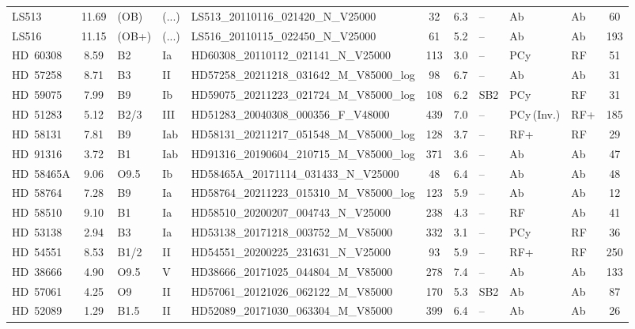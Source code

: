 {\begin{landscape}
\begin{longtable}{lclllcclllc}
\noalign{\smallskip}
LS513 & 11.69 & (OB) & (...) & LS513\_20110116\_021420\_N\_V25000 & 32 & 6.3 & -- & Ab & Ab & 60 \\
\noalign{\smallskip}
LS516 & 11.15 & (OB+) & (...) & LS516\_20110115\_022450\_N\_V25000 & 61 & 5.2 & -- & Ab & Ab & 193 \\
\noalign{\smallskip}
HD~60308 & 8.59 & B2 & Ia & HD60308\_20110112\_021141\_N\_V25000 & 113 & 3.0 & -- & PCy & RF & 51 \\
\noalign{\smallskip}
HD~57258 & 8.71 & B3 & II & HD57258\_20211218\_031642\_M\_V85000\_log & 98 & 6.7 & -- & Ab & Ab & 31 \\
\noalign{\smallskip}
HD~59075 & 7.99 & B9 & Ib & HD59075\_20211223\_021724\_M\_V85000\_log & 108 & 6.2 & SB2 & PCy & RF & 31 \\
\noalign{\smallskip}
HD~51283 & 5.12 & B2/3 & III & HD51283\_20040308\_000356\_F\_V48000 & 439 & 7.0 & -- & PCy\,(Inv.) & RF+ & 185 \\
\noalign{\smallskip}
HD~58131 & 7.81 & B9 & Iab & HD58131\_20211217\_051548\_M\_V85000\_log & 128 & 3.7 & -- & RF+ & RF & 29 \\
\noalign{\smallskip}
HD~91316 & 3.72 & B1 & Iab & HD91316\_20190604\_210715\_M\_V85000\_log & 371 & 3.6 & -- & Ab & Ab & 47 \\
\noalign{\smallskip}
HD~58465A & 9.06 & O9.5 & Ib & HD58465A\_20171114\_031433\_N\_V25000 & 48 & 6.4 & -- & Ab & Ab & 48 \\
\noalign{\smallskip}
HD~58764 & 7.28 & B9 & Ia & HD58764\_20211223\_015310\_M\_V85000\_log & 123 & 5.9 & -- & Ab & Ab & 12 \\
\noalign{\smallskip}
HD~58510 & 9.10 & B1 & Ia & HD58510\_20200207\_004743\_N\_V25000 & 238 & 4.3 & -- & RF & Ab & 41 \\
\noalign{\smallskip}
HD~53138 & 2.94 & B3 & Ia & HD53138\_20171218\_003752\_M\_V85000 & 332 & 3.1 & -- & PCy & RF & 36 \\
\noalign{\smallskip}
HD~54551 & 8.53 & B1/2 & II & HD54551\_20200225\_231631\_N\_V25000 & 93 & 5.9 & -- & RF+ & RF & 250 \\
\noalign{\smallskip}
HD~38666 & 4.90 & O9.5 & V & HD38666\_20171025\_044804\_M\_V85000 & 278 & 7.4 & -- & Ab & Ab & 133 \\
\noalign{\smallskip}
HD~57061 & 4.25 & O9 & II & HD57061\_20121026\_062122\_M\_V85000 & 170 & 5.3 & SB2 & Ab & Ab & 87 \\
\noalign{\smallskip}
HD~52089 & 1.29 & B1.5 & II & HD52089\_20171030\_063304\_M\_V85000 & 399 & 6.4 & -- & Ab & Ab & 26 \\

\end{longtable}
\end{landscape}}
